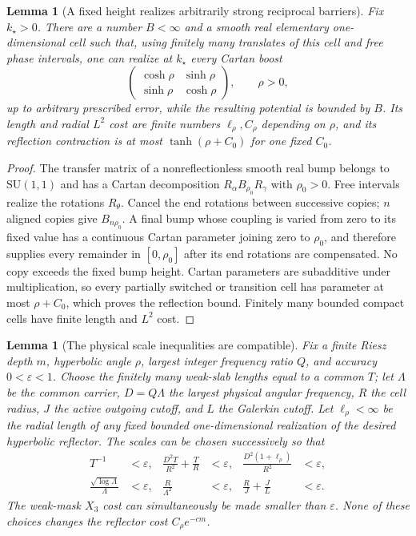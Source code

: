 \documentclass[11pt]{article}
\newtheorem{lemma}[theorem]{Lemma}
\theoremstyle{remark}
\begin{document}
\begin{lemma}[A fixed height realizes arbitrarily strong reciprocal barriers]
\label{lem:bounded-reflector}
Fix $k_\star>0$.  There are a number $B<\infty$ and a smooth real elementary
one-dimensional cell such that, using finitely many translates of this cell
and free phase intervals, one can realize at $k_\star$ every Cartan boost
\[
 \begin{pmatrix}\cosh\rho&\sinh\rho\\
                 \sinh\rho&\cosh\rho\end{pmatrix},
 \qquad \rho>0,
\]
up to arbitrary prescribed error, while the resulting potential is bounded
by $B$.  Its length and radial $L^2$ cost are finite numbers
$\ell_\rho,C_\rho$ depending on $\rho$, and its reflection contraction is at
most $\tanh(\rho+C_0)$ for one fixed $C_0$.
\end{lemma}

\begin{proof}
The transfer matrix of a nonreflectionless smooth real bump belongs to
$\mathrm{SU}(1,1)$ and has a Cartan decomposition
$R_\alpha B_{\rho_0}R_\gamma$ with $\rho_0>0$.  Free intervals realize the
rotations $R_\theta$.  Cancel the end rotations between successive copies;
$n$ aligned copies give $B_{n\rho_0}$.  A final bump whose coupling is varied
from zero to its fixed value has a continuous Cartan parameter joining zero
to $\rho_0$, and therefore supplies every remainder in $[0,\rho_0]$ after
its end rotations are compensated.  No copy exceeds the fixed bump height.
Cartan parameters are
subadditive under multiplication, so every partially switched or transition
cell has parameter at most $\rho+C_0$, which proves the reflection bound.
Finitely many bounded compact cells have finite length and $L^2$ cost.
\end{proof}

\begin{lemma}[The physical scale inequalities are compatible]
\label{lem:scale-compatibility}
Fix a finite Riesz depth $m$, hyperbolic angle $\rho$, largest integer
frequency ratio $Q$, and accuracy $0<\varepsilon<1$.  Choose the finitely
many weak-slab lengths equal to a common $T$; let $\Lambda$ be the common
carrier, $D=Q\Lambda$ the
largest physical angular frequency, $R$ the cell radius, $J$ the active
outgoing cutoff, and $L$ the Galerkin cutoff.  Let
$\ell_\rho<\infty$ be the radial length of any fixed bounded one-dimensional
realization of the desired hyperbolic reflector.  The scales can be chosen
successively so that
\begin{align}
 T^{-1}&<\varepsilon,
 &\frac{D^2T}{R^2}+\frac TR&<\varepsilon,
 &\frac{D^2(1+\ell_\rho)}{R^2}&<\varepsilon,
 \label{eq:scale-mask-reflector}\\
 \frac{\sqrt{\log\Lambda}}{\Lambda}&<\varepsilon,
 &\frac R{\Lambda^2}&<\varepsilon,
 &\frac RJ+\frac JL&<\varepsilon.
 \label{eq:scale-talbot-buffer}
\end{align}
The weak-mask $X_3$ cost can simultaneously be made smaller than
$\varepsilon$.  None of these choices changes the reflector cost
$C_\rho e^{-cm}$.
\end{lemma}
\end{document}

